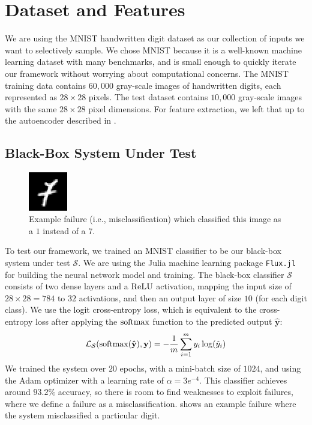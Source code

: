 \section{Dataset and Features}
We are using the MNIST handwritten digit dataset \citep{deng2012mnist} as our collection of inputs we want to selectively sample.
We chose MNIST because it is a well-known machine learning dataset with many benchmarks, and is small enough to quickly iterate our framework without worrying about computational concerns.
The MNIST training data contains $60{,}000$ gray-scale images of handwritten digits, each represented as $28\times28$ pixels. The test dataset contains $10{,}000$ gray-scale images with the same $28\times28$ pixel dimensions. For feature extraction, we left that up to the autoencoder described in .



\subsection{Black-Box System Under Test}
\begin{figure}
  \vspace{-30pt}
  \centering
  \centerline{\includegraphics[width=0.15\textwidth]{figures/weakness_rec/MNIST-failure-7(1).png}}
  \caption{Example failure (i.e., misclassification) which classified this image as a $1$ instead of a $7$.}
  \label{fig:mnist_nn_failure}
\end{figure}
To test our framework, we trained an MNIST classifier to be our black-box system under test $\mathcal{S}$.
We are using the Julia machine learning package \texttt{Flux.jl} \citep{innes:2018} for building the neural network model and training.
The black-box classifier $\mathcal{S}$ consists of two dense layers and a $\operatorname{ReLU}$ activation, mapping the input size of $28\times28=784$ to $32$ activations, and then an output layer of size $10$ (for each digit class).
We use the logit cross-entropy loss, which is equivalent to the cross-entropy loss after applying the $\operatorname{softmax}$ function to the predicted output $\mathbf{\hat y}$:
\begin{equation*}
\mathcal{L}_\mathcal{S}(\operatorname{softmax}(\mathbf{\hat y}), \mathbf{y}) = -\frac{1}{m} \sum_{i=1}^m y_i \log(\hat y_i)
\end{equation*}
We trained the system over $20$ epochs, with a mini-batch size of $1024$, and using the Adam optimizer \citep{kingma2017adam} with a learning rate of $\alpha=3e^{-4}$. This classifier achieves around $93.2\%$ accuracy, so there is room to find weaknesses to exploit failures, where we define a failure as a misclassification.
 shows an example failure where the system misclassified a particular digit.




